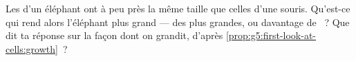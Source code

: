 \begin{exercise}[$\star\star\star$]\label{exo:g5:first-look-at-cells:11}
Les  d'un éléphant ont à peu près la même taille que celles
d'une souris. Qu'est-ce qui rend alors l'éléphant plus grand --- des
 plus grandes, ou davantage de ~? Que dit ta réponse
sur la façon dont on grandit, d'après
\cref{prop:g5:first-look-at-cells:growth}~?
\end{exercise}
